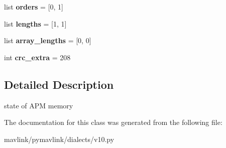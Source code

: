 \begin{DoxyCompactItemize}
list {\bfseries orders} = \mbox{[}0, 1\mbox{]}
\item 
\mbox{\label{classpymavlink_1_1dialects_1_1v10_1_1MAVLink__meminfo__message_ab36fd1a284a91806deb5c1958d3b3dca}} 
list {\bfseries lengths} = \mbox{[}1, 1\mbox{]}
\item 
\mbox{\label{classpymavlink_1_1dialects_1_1v10_1_1MAVLink__meminfo__message_ac629a7bf7533b31e2b8b6d55e860ea88}} 
list {\bfseries array\+\_\+lengths} = \mbox{[}0, 0\mbox{]}
\item 
\mbox{\label{classpymavlink_1_1dialects_1_1v10_1_1MAVLink__meminfo__message_a7fe81208b9830166e958340a3a51c46d}} 
int {\bfseries crc\+\_\+extra} = 208
\end{DoxyCompactItemize}


\subsection{Detailed Description}
\begin{DoxyVerb}state of APM memory
\end{DoxyVerb}
 

The documentation for this class was generated from the following file\+:\begin{DoxyCompactItemize}
\item 
mavlink/pymavlink/dialects/v10.\+py\end{DoxyCompactItemize}
